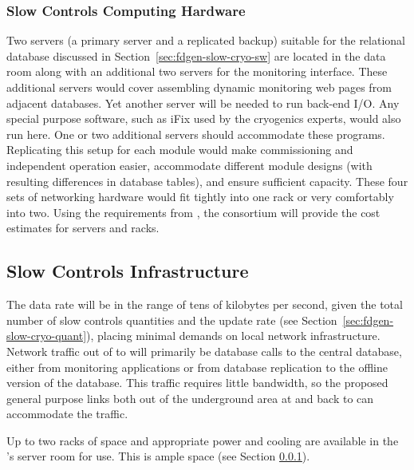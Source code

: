 \subsubsection{Slow Controls Computing Hardware}
\label{sec:fdgen-slow-cryo-slow-compute}
Two servers (a primary server and a replicated backup) suitable for the relational database discussed
in Section~\ref{sec:fdgen-slow-cryo-sw} are located in the  data
room along with an additional
two servers for the  monitoring interface. These additional servers would cover assembling dynamic  monitoring web pages from adjacent
databases.  Yet another server will be needed to run back-end I/O.  Any special purpose software, such as iFix used by the cryogenics experts, would
also run here. One or two additional servers should accommodate these programs.
Replicating this setup for each module would make commissioning and independent operation easier, accommodate different module
designs (with resulting differences in database tables), and ensure
sufficient capacity.  These four sets of networking hardware would fit tightly into one rack or very comfortably into two. Using the requirements from , the  consortium will provide the cost estimates for servers and racks. 



\subsection{Slow Controls Infrastructure}
\label{sec:fdgen-slow-cryo-slow-infra}

The data rate will be in the range of tens of kilobytes per second, given the total number of slow controls quantities and the update rate  
(see Section~\ref{sec:fdgen-slow-cryo-quant}), placing minimal demands
on local network infrastructure.
Network traffic out of \surf to \fnal will primarily be database calls
to the central  database, either from monitoring applications or from
database replication to the offline version of the  database.  This
traffic requires little bandwidth, so the proposed general purpose
links both out of the %
underground area at \surf and back to \fnal can accommodate the traffic.

Up to two racks of space and appropriate power and cooling are
available in the 's  server room for  use. This is ample space (see Section
\ref{sec:fdgen-slow-cryo-slow-compute}).


